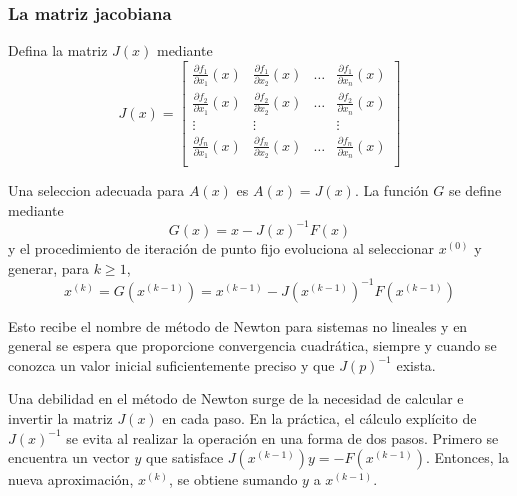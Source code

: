 \subsubsection{La matriz jacobiana}
Defina la matriz $J(x)$ mediante
\begin{equation}
    J(x) = 
    \begin{bmatrix}
        \frac{\partial f_1}{\partial x_1} (x) & \frac{\partial f_1}{\partial x_2} (x) & \dots & \frac{\partial f_1}{\partial x_n} (x) \\
        \frac{\partial f_2}{\partial x_1} (x) & \frac{\partial f_2}{\partial x_2} (x) & \dots & \frac{\partial f_2}{\partial x_n} (x) \\
        \vdots & \vdots & & \vdots \\
        \frac{\partial f_n}{\partial x_1} (x) & \frac{\partial f_n}{\partial x_2} (x) & \dots & \frac{\partial f_n}{\partial x_n} (x) \\
    \end{bmatrix}
\end{equation}

Una seleccion adecuada para $A(x)$ es $A(x) = J(x)$. La función $G$ se define mediante
\[ G(x) = x - J(x)^{-1} F(x) \]
y el procedimiento de iteración de punto fijo evoluciona al seleccionar $x^{(0)}$ y generar, para $k \geq 1$,
\begin{equation}
    x^{(k)} = G(x^{(k - 1)}) = x^{(k-1)} - J(x^{(k-1)})^{-1} F(x^{(k-1)})
\end{equation}

Esto recibe el nombre de método de Newton para sistemas no lineales y en general se espera que proporcione convergencia cuadrática, siempre y cuando se conozca un valor inicial suficientemente preciso y que $J(p)^{-1}$ exista.

Una debilidad en el método de Newton surge de la necesidad de calcular e invertir la matriz $J(x)$ en cada paso. En la práctica, el cálculo explícito de $J(x)^{-1}$ se evita al realizar la operación en una forma de dos pasos. Primero se encuentra un vector $y$ que satisface $J(x^{(k - 1)})y = -F(x^{(k - 1)})$. Entonces, la nueva aproximación, $x^{(k)}$, se obtiene sumando $y$ a $x^{(k - 1)}$.